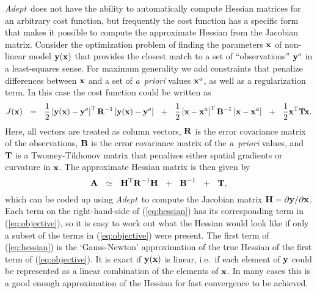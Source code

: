 \documentclass[a4,oneside]{book}
\def\x{\ensuremath{{\bf x}}}
\def\y{\ensuremath{{\bf y}}}
\def\Adept{\emph{Adept}}
\begin{document}
\Adept\ does not have the ability to automatically compute Hessian
matrices for an arbitrary cost function, but frequently the cost
function has a specific form that makes it possible to compute the
approximate Hessian from the Jacobian matrix.  Consider the
optimization problem of finding the parameters $\x$ of non-linear
model $\y(\x)$ that provides the closest match to a set of
``observations'' $\y^o$ in a least-squares sense.  For maximum
generality we add constraints that penalize differences between $\x$
and a set of \emph{a~priori} values $\x^a$, as well as a
regularization term.  In this case the cost function could be written
as \def\myspace{~~}
\begin{equation}
J(\x) \myspace =\myspace \frac12\left[\y(\x)-\y^o\right]^\mathrm{T}{\bf
  R}^{-1}\left[\y(\x)-\y^o\right]
\myspace+\myspace\frac12\left[\x-\x^a\right]^\mathrm{T}{\bf
  B}^{-1}\left[\x-\x^a\right]
\myspace+\myspace\frac12\x^\mathrm{T}{\bf T}\x.\nonumber
\label{eq:objective}
\end{equation}
Here, all vectors are treated as column vectors, ${\bf R}$ is the
error covariance matrix of the observations, ${\bf B}$ is the error
covariance matrix of the \emph{a~priori} values, and ${\bf T}$ is a
Twomey-Tikhonov matrix that penalizes either spatial gradients or
curvature in $\x$.  The approximate Hessian matrix is then given by
\begin{equation}
{\bf A} \myspace\simeq\myspace {\bf H}^\mathrm{T}{\bf
  R}^{-1}{\bf H}\nonumber
\myspace+\myspace {\bf B}^{-1} \myspace+\myspace {\bf T},
\label{eq:hessian}
\end{equation}
which can be coded up using \Adept\ to compute the Jacobian matrix
${\bf H}=\partial\y/\partial\x$. Each term on the right-hand-side of
(\ref{eq:hessian}) has its corresponding term in (\ref{eq:objective}),
so it is easy to work out what the Hessian would look like if only a
subset of the terms in (\ref{eq:objective}) were present. The first
term of (\ref{eq:hessian}) is the `Gauss-Newton' approximation of the
true Hessian of the first term of (\ref{eq:objective}).  It is exact
if $\y(\x)$ is linear, i.e.\ if each element of $\y$ could be
represented as a linear combination of the elements of $\x$. In many
cases this is a good enough approximation of the Hessian for fast
convergence to be achieved.
\end{document}
